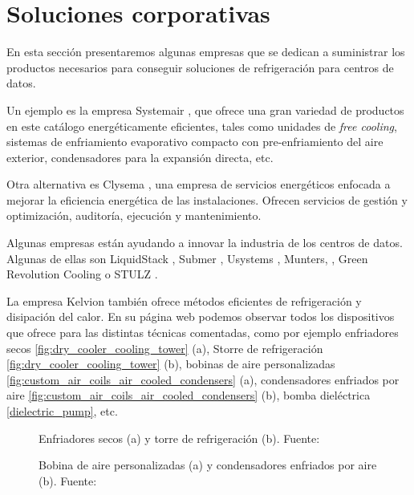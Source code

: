 \section{Soluciones corporativas} \label{empresas}

En esta sección presentaremos algunas empresas que se dedican a suministrar los productos necesarios para conseguir soluciones de refrigeración para centros de datos.

Un ejemplo es la empresa Systemair \cite{systemair}, que ofrece una gran variedad de productos en este catálogo  energéticamente eficientes, tales como unidades de \textit{free cooling}, sistemas de enfriamiento evaporativo compacto con pre-enfriamiento del aire exterior, condensadores para la expansión directa, etc.

Otra alternativa es Clysema \cite{clysema}, una empresa de servicios energéticos enfocada a mejorar la eficiencia energética de las instalaciones. Ofrecen servicios de gestión y optimización, auditoría, ejecución y mantenimiento.

Algunas empresas están ayudando a innovar la industria de los centros de datos. Algunas de ellas son LiquidStack \cite{liquidstack}, Submer \cite{submer}, Usystems \cite{usystems}, Munters, \cite{munters}, Green Revolution Cooling \cite{GRC} o STULZ \cite{stulz}.

La empresa Kelvion \cite{Kelvion} también ofrece métodos eficientes de refrigeración y disipación del calor. En su página web podemos observar todos los dispositivos que ofrece para las distintas técnicas comentadas, como por ejemplo enfriadores secos \eqref{fig:dry_cooler_cooling_tower} (a), Storre de refrigeración \eqref{fig:dry_cooler_cooling_tower} (b), bobinas de aire personalizadas \eqref{fig:custom_air_coils_air_cooled_condensers} (a), condensadores enfriados por aire \eqref{fig:custom_air_coils_air_cooled_condensers} (b), bomba dieléctrica \eqref{dielectric_pump}, etc.

\begin{figure}%
    \centering
    \qquad
    \caption{Enfriadores secos (a) y torre de refrigeración (b). Fuente: \cite{Kelvion}}%
    \label{fig:dry_cooler_cooling_tower}%
\end{figure}

\begin{figure}%
    \centering
    \qquad
    \caption{Bobina de aire personalizadas (a) y condensadores enfriados por aire (b). Fuente: \cite{Kelvion}}%
    \label{fig:custom_air_coils_air_cooled_condensers}%
\end{figure}

